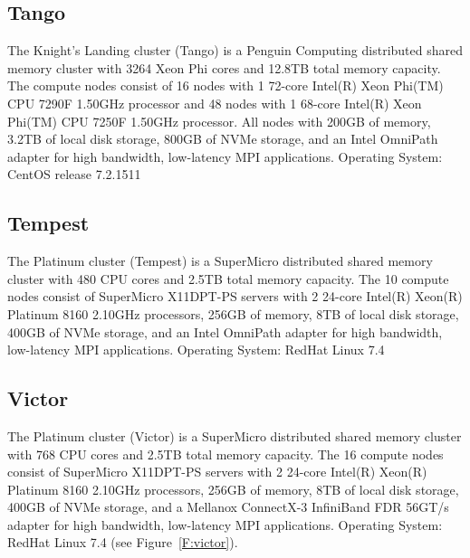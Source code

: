 \subsection{Tango}

The Knight’s Landing cluster (Tango) is a Penguin Computing
distributed shared memory cluster with 3264 Xeon Phi cores and 12.8TB
total memory capacity. The compute nodes consist of 16 nodes with 1
72-core Intel(R) Xeon Phi(TM) CPU 7290F 1.50GHz processor and 48 nodes
with 1 68-core Intel(R) Xeon Phi(TM) CPU 7250F 1.50GHz processor. All
nodes with 200GB of memory, 3.2TB of local disk storage, 800GB of NVMe
storage, and an Intel OmniPath adapter for high bandwidth, low-latency
MPI applications. Operating System: CentOS release 7.2.1511

\subsection{Tempest}

The Platinum cluster (Tempest) is a SuperMicro distributed shared
memory cluster with 480 CPU cores and 2.5TB total memory capacity. The
10 compute nodes consist of SuperMicro X11DPT-PS servers with 2
24-core Intel(R) Xeon(R) Platinum 8160 2.10GHz processors, 256GB of
memory, 8TB of local disk storage, 400GB of NVMe storage, and an Intel
OmniPath adapter for high bandwidth, low-latency MPI
applications. Operating System: RedHat Linux 7.4

\subsection{Victor}

The Platinum cluster (Victor) is a SuperMicro distributed shared
memory cluster with 768 CPU cores and 2.5TB total memory capacity. The
16 compute nodes consist of SuperMicro X11DPT-PS servers with 2
24-core Intel(R) Xeon(R) Platinum 8160 2.10GHz processors, 256GB of
memory, 8TB of local disk storage, 400GB of NVMe storage, and a
Mellanox ConnectX-3 InfiniBand FDR 56GT/s adapter for high bandwidth,
low-latency MPI applications. Operating System: RedHat Linux 7.4
(see Figure~\ref{F:victor}).

